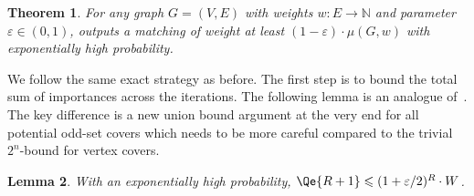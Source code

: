 \documentclass{article}
\newtheorem{theorem}{Theorem}\newtheorem{lemma}[theorem]{Lemma}\newtheorem{proposition}[theorem]{Proposition}\newtheorem{corollary}[theorem]{Corollary}\newtheorem{definition}[theorem]{Definition}\newtheorem{claim}[theorem]{Claim}\newtheorem{remark}[theorem]{Remark}\newtheorem{observation}[theorem]{Observation}\newtheorem{conjecture}[theorem]{Conjecture}\newtheorem{example}[theorem]{Example}
\renewcommand{\leq}{\leqslant}
\newcommand{\eps}{\varepsilon}
\newcommand{\IN}{\mathbb{N}}
\begin{document}
\begin{theorem}\label{thm:alg-general}
	For any graph $G=(V,E)$ with weights $w: E \rightarrow \IN$ and parameter $\eps \in (0,1)$,  outputs a matching of weight at least $(1-\eps) \cdot \mu(G,w)$ with exponentially high probability. 
\end{theorem}

We follow the same exact strategy as before. The first step is to bound the total sum of importances across the iterations. The following lemma
is an analogue of~. The key difference is a new union bound argument at the very end
for all potential odd-set covers which needs to be more careful compared to the trivial $2^n$-bound for vertex covers. 

\begin{lemma}\label{lem:Qr-small-general}
	With an exponentially high probability, $\Qe{R+1} \leq (1+\eps/2)^{R} \cdot W$.   
\end{lemma}
\end{document}
